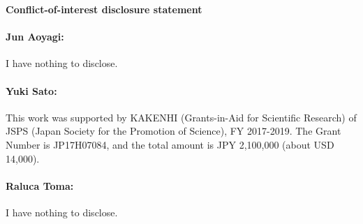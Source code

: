 \begin{center}\textbf{Conflict-of-interest disclosure statement}
\end{center}

\paragraph{Jun Aoyagi:} I have nothing to disclose.
\paragraph{Yuki Sato:} This work was supported by KAKENHI (Grants-in-Aid for Scientific Research) of JSPS (Japan Society for the Promotion of Science), FY 2017-2019. The Grant Number is JP17H07084, and the total amount is JPY 2,100,000 (about USD 14,000).
\paragraph{Raluca Toma:} I have nothing to disclose.